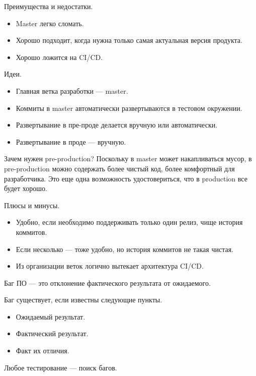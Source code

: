     \begin{Rem}
        Преимущества и недостатки.
        \begin{itemize}
            \item Master легко сломать.
            \item Хорошо подходит, когда нужна только самая актуальная версия продукта.
            \item Хорошо ложится на CI/CD. 
        \end{itemize}
    \end{Rem}

    \begin{Rem}
        Идеи.
        \begin{itemize}
            \item Главная ветка разработки --- master.
            \item Коммиты в master автоматически развертываются в тестовом окружении.
            \item Развертывание в пре-проде делается вручную или автоматически.
            \item Развертывание в проде --- вручную.
        \end{itemize}
        Зачем нужен pre-production? Поскольку в master может накапливаться мусор, в pre-production можно содержать более чистый код, более комфортный для разработчика. Это еще одна возможность удостовериться, что в production все будет хорошо.
    \end{Rem}

    \begin{Rem}
        Плюсы и минусы.
        \begin{itemize}
            \item Удобно, если необходимо поддерживать только один релиз, чище история коммитов.
            \item Если несколько --- тоже удобно, но история коммитов не такая чистая.
            \item Из организации веток логично вытекает архитектура CI/CD.
        \end{itemize}
    \end{Rem}


    \begin{Def}[Баг ПО]
        Баг ПО --- это отклонение фактического результата от ожидаемого.

        Баг существует, если известны следующие пункты.
        \begin{itemize}
            \item Ожидаемый результат.
            \item Фактический результат.
            \item Факт их отличия.
        \end{itemize}

        Любое тестирование --- поиск багов.
    \end{Def}

